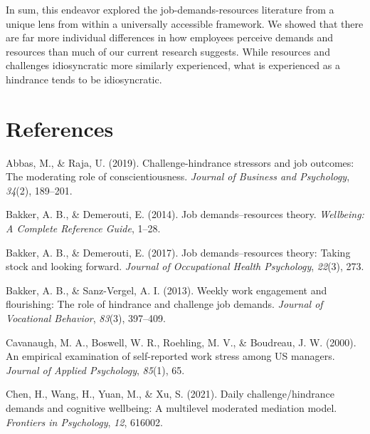 \documentclass[
  jou,mask]{apa6}
\newlength{\cslhangindent}
\newlength{\cslentryspacingunit} %
\newenvironment{CSLReferences}[2] %
 {%
  \setlength{\parindent}{0pt}
  \ifodd #1
  \let\oldpar\par
  \def\par{\hangindent=\cslhangindent\oldpar}
  \fi
  \setlength{\parskip}{#2\cslentryspacingunit}
 }%
 {}
\begin{document}
In sum, this endeavor explored the job-demands-resources literature from a unique lens from within a universally accessible framework. We showed that there are far more individual differences in how employees perceive demands and resources than much of our current research suggests. While resources and challenges idiosyncratic more similarly experienced, what is experienced as a hindrance tends to be idiosyncratic.

\hypertarget{references}{%
\section{References}\label{references}}

\begingroup
\setlength{\parindent}{-0.5in}
\setlength{\leftskip}{0.5in}

\hypertarget{refs}{}
\begin{CSLReferences}{1}{0}
\leavevmode{}%
Abbas, M., \& Raja, U. (2019). Challenge-hindrance stressors and job outcomes: The moderating role of conscientiousness. \emph{Journal of Business and Psychology}, \emph{34}(2), 189--201.

\leavevmode{}%
Bakker, A. B., \& Demerouti, E. (2014). Job demands--resources theory. \emph{Wellbeing: A Complete Reference Guide}, 1--28.

\leavevmode{}%
Bakker, A. B., \& Demerouti, E. (2017). Job demands--resources theory: Taking stock and looking forward. \emph{Journal of Occupational Health Psychology}, \emph{22}(3), 273.

\leavevmode{}%
Bakker, A. B., \& Sanz-Vergel, A. I. (2013). Weekly work engagement and flourishing: The role of hindrance and challenge job demands. \emph{Journal of Vocational Behavior}, \emph{83}(3), 397--409.

\leavevmode{}%
Cavanaugh, M. A., Boswell, W. R., Roehling, M. V., \& Boudreau, J. W. (2000). An empirical examination of self-reported work stress among US managers. \emph{Journal of Applied Psychology}, \emph{85}(1), 65.

\leavevmode{}%
Chen, H., Wang, H., Yuan, M., \& Xu, S. (2021). Daily challenge/hindrance demands and cognitive wellbeing: A multilevel moderated mediation model. \emph{Frontiers in Psychology}, \emph{12}, 616002.


\end{CSLReferences}
\end{document}
